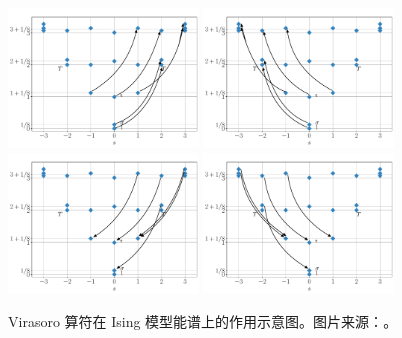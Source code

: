 \begin{figure}[ht]
  \includegraphics[width=0.45\textwidth]{images/virasoro/ising-lm2.pdf}    \quad
  \includegraphics[width=0.45\textwidth]{images/virasoro/ising-lbarm2.pdf} \\
  \includegraphics[width=0.45\textwidth]{images/virasoro/ising-l2.pdf}     \quad
  \includegraphics[width=0.45\textwidth]{images/virasoro/ising-lbar2.pdf}
  \caption[Virasoro 算符在 Ising 模型能谱上的作用示意图]{Virasoro 算符在 Ising 模型能谱上的作用示意图。图片来源：\parencite{wang2022virasoro}。}
  \label{fig:ising-virasoro-all}
\end{figure}

